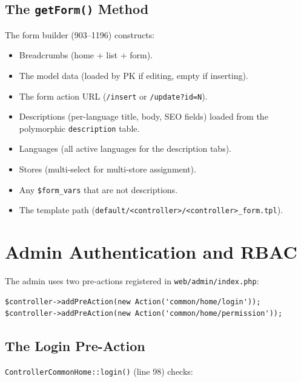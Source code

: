 \documentclass[11pt,a4paper]{article}
\begin{document}
\subsection{The \texttt{getForm()} Method}

The form builder (903--1196) constructs:

\begin{itemize}[leftmargin=1.6em,itemsep=2pt]
  \item Breadcrumbs (home + list + form).
  \item The model data (loaded by PK if editing, empty if inserting).
  \item The form action URL (\texttt{/insert} or \texttt{/update?id=N}).
  \item Descriptions (per-language title, body, SEO fields) loaded from
        the polymorphic \texttt{description} table.
  \item Languages (all active languages for the description tabs).
  \item Stores (multi-select for multi-store assignment).
  \item Any \texttt{\$form\_vars} that are not descriptions.
  \item The template path (\texttt{default/<controller>/<controller>\_form.tpl}).
\end{itemize}

\section{Admin Authentication and RBAC}\label{sec:auth-rbac}

The admin uses two pre-actions registered in \texttt{web/admin/index.php}:

\begin{lstlisting}[caption={Admin pre-actions in \texttt{web/admin/index.php}.},label={lst:admin-preactions}]
$controller->addPreAction(new Action('common/home/login'));
$controller->addPreAction(new Action('common/home/permission'));
\end{lstlisting}

\subsection{The Login Pre-Action}

\texttt{ControllerCommonHome::login()} (line 98) checks:
\end{document}
